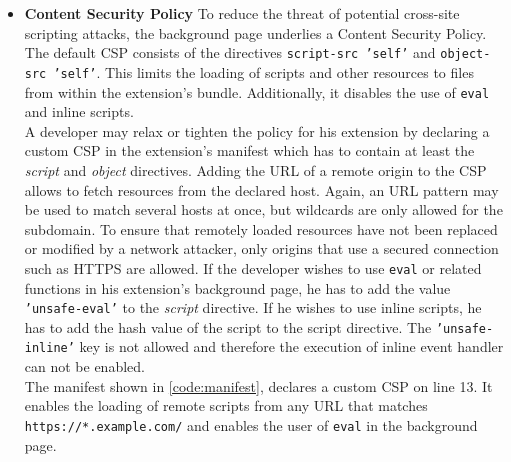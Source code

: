 \begin{itemize}
		\item \textbf{Content Security Policy} To reduce the threat of potential cross-site scripting attacks, the background page underlies a Content Security Policy. The default CSP consists of the directives \texttt{script-src 'self'} and \texttt{object-src 'self'}. This limits the loading of scripts and other resources to files from within the extension's bundle. Additionally, it disables the use of \texttt{eval} and inline scripts. \\
		A developer may relax or tighten the policy for his extension by declaring a custom CSP in the extension's manifest which has to contain at least the \textit{script} and \textit{object} directives. Adding the URL of a remote origin to the CSP allows to fetch resources from the declared host. Again, an URL pattern may be used to match several hosts at once, but wildcards are only allowed for the subdomain. To ensure that remotely loaded resources have not been replaced or modified by a network attacker, only origins that use a secured connection such as HTTPS are allowed. If the developer wishes to use \texttt{eval} or related functions in his extension's background page, he has to add the value \texttt{'unsafe-eval'} to the \textit{script} directive. If he wishes to use inline scripts, he has to add the hash value of the script to the script directive. The \texttt{'unsafe-inline'} key is not allowed and therefore the execution of inline event handler can not be enabled. \\
		The manifest shown in \autoref{code:manifest}, declares a custom CSP on line 13. It enables the loading of remote scripts from any URL that matches \texttt{https://*.example.com/} and enables the user of \texttt{eval} in the background page.
	

\end{itemize}
